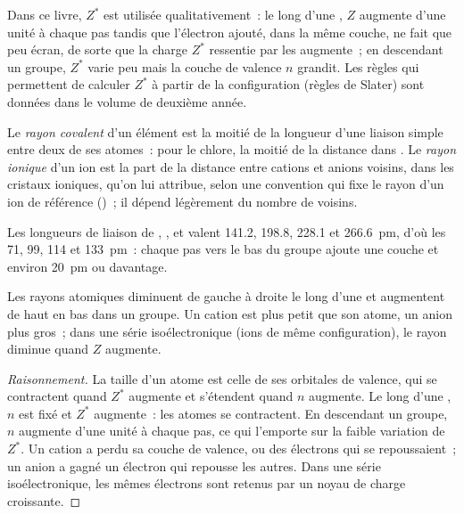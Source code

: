 \begin{remark}\label{rem:b1:periodicity:slater}
Dans ce livre, $Z^{*}$ est utilisée qualitativement~: le long d'une
, $Z$ augmente d'une unité à chaque pas tandis que l'électron
ajouté, dans la même couche, ne fait que peu écran, de sorte que la
charge $Z^{*}$ ressentie par les  augmente~; en
descendant un groupe, $Z^{*}$ varie peu mais la couche de valence $n$
grandit. Les règles qui permettent de calculer $Z^{*}$ à partir de la
configuration (règles de Slater) sont données dans le volume de deuxième
année.
\end{remark}

\begin{definition}\label{def:b1:periodicity:radius}
Le \emph{rayon covalent} d'un élément est la moitié
de la longueur d'une liaison simple entre deux de ses atomes~: pour le
chlore, la moitié de la distance  dans . Le \emph{rayon
ionique} d'un ion est la part de la distance entre
cations et anions voisins, dans les cristaux ioniques, qu'on lui
attribue, selon une convention qui fixe le rayon d'un ion de référence
()~; il dépend légèrement du nombre de voisins.
\end{definition}

\begin{example}\label{ex:b1:periodicity:halogen-radii}
Les longueurs de liaison de , ,  et  valent
141.2, 198.8, 228.1 et \qty{266.6}{pm}, d'où les  71,
99, 114 et \qty{133}{pm}~: chaque pas vers le bas du groupe ajoute une
couche et environ \qty{20}{pm} ou davantage.
\end{example}

\begin{proposition}\label{prop:b1:periodicity:radius-trend}
Les rayons atomiques diminuent de gauche à droite le long d'une 
et augmentent de haut en bas dans un groupe. Un cation est plus petit
que son atome, un anion plus gros~; dans une série isoélectronique (ions
de même configuration), le rayon diminue quand $Z$ augmente.
\end{proposition}

\begin{proof}[Raisonnement]
La taille d'un atome est celle de ses orbitales de valence, qui se
contractent quand $Z^{*}$ augmente et s'étendent quand $n$ augmente. Le
long d'une , $n$ est fixé et $Z^{*}$ augmente~: les atomes se
contractent. En descendant un groupe, $n$ augmente d'une unité à chaque
pas, ce qui l'emporte sur la faible variation de $Z^{*}$. Un cation a
perdu sa couche de valence, ou des électrons qui se repoussaient~; un
anion a gagné un électron qui repousse les autres. Dans une série
isoélectronique, les mêmes électrons sont retenus par un noyau de charge
croissante.
\end{proof}

